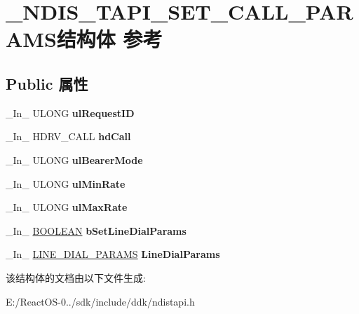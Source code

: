 \hypertarget{struct___n_d_i_s___t_a_p_i___s_e_t___c_a_l_l___p_a_r_a_m_s}{}\section{\+\_\+\+N\+D\+I\+S\+\_\+\+T\+A\+P\+I\+\_\+\+S\+E\+T\+\_\+\+C\+A\+L\+L\+\_\+\+P\+A\+R\+A\+M\+S结构体 参考}
\label{struct___n_d_i_s___t_a_p_i___s_e_t___c_a_l_l___p_a_r_a_m_s}
\subsection*{Public 属性}
\begin{DoxyCompactItemize}
\item 
\mbox{\label{struct___n_d_i_s___t_a_p_i___s_e_t___c_a_l_l___p_a_r_a_m_s_a577f24e1ee26ec814a019c4317a5576b}} 
\+\_\+\+In\+\_\+ U\+L\+O\+NG {\bfseries ul\+Request\+ID}
\item 
\mbox{\label{struct___n_d_i_s___t_a_p_i___s_e_t___c_a_l_l___p_a_r_a_m_s_a01d2161b3beffa477e3ae56aa0a16d3d}} 
\+\_\+\+In\+\_\+ H\+D\+R\+V\+\_\+\+C\+A\+LL {\bfseries hd\+Call}
\item 
\mbox{\label{struct___n_d_i_s___t_a_p_i___s_e_t___c_a_l_l___p_a_r_a_m_s_a5b9ecffb857e0e0edd4e895b549637fa}} 
\+\_\+\+In\+\_\+ U\+L\+O\+NG {\bfseries ul\+Bearer\+Mode}
\item 
\mbox{\label{struct___n_d_i_s___t_a_p_i___s_e_t___c_a_l_l___p_a_r_a_m_s_a99f14c2d35e9e712ba70abaa78235b4c}} 
\+\_\+\+In\+\_\+ U\+L\+O\+NG {\bfseries ul\+Min\+Rate}
\item 
\mbox{\label{struct___n_d_i_s___t_a_p_i___s_e_t___c_a_l_l___p_a_r_a_m_s_a814bfb0eaed1c0df6cbdd029a4211b47}} 
\+\_\+\+In\+\_\+ U\+L\+O\+NG {\bfseries ul\+Max\+Rate}
\item 
\mbox{\label{struct___n_d_i_s___t_a_p_i___s_e_t___c_a_l_l___p_a_r_a_m_s_a97800e4b07a6e10d2a107776b04eb3d8}} 
\+\_\+\+In\+\_\+ \hyperlink{_processor_bind_8h_a112e3146cb38b6ee95e64d85842e380a}{B\+O\+O\+L\+E\+AN} {\bfseries b\+Set\+Line\+Dial\+Params}
\item 
\mbox{\label{struct___n_d_i_s___t_a_p_i___s_e_t___c_a_l_l___p_a_r_a_m_s_abf018a6ac31822132e34d8acc2c929f7}} 
\+\_\+\+In\+\_\+ \hyperlink{struct___l_i_n_e___d_i_a_l___p_a_r_a_m_s}{L\+I\+N\+E\+\_\+\+D\+I\+A\+L\+\_\+\+P\+A\+R\+A\+MS} {\bfseries Line\+Dial\+Params}
\end{DoxyCompactItemize}


该结构体的文档由以下文件生成\+:\begin{DoxyCompactItemize}
\item 
E\+:/\+React\+O\+S-\/0../sdk/include/ddk/ndistapi.\+h\end{DoxyCompactItemize}
